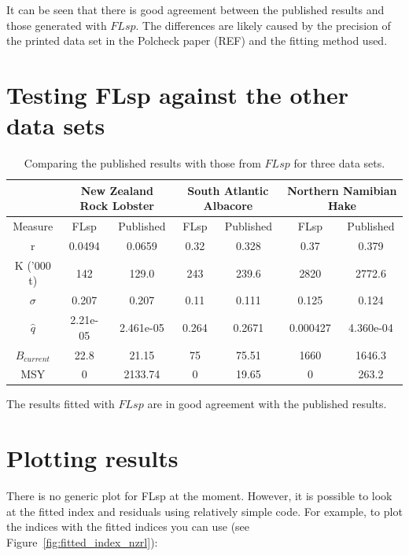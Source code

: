 \documentclass[a4paper]{article}
\begin{document}
It can be seen that there is good agreement between the published results and those generated with $FLsp$. The differences are likely caused by the precision of the printed data set in the Polcheck paper (REF) and the fitting method used.

\section{Testing FLsp against the other data sets}



\begin{table}
\begin{tabular}{|c|c|c|c|c|c|c|}
\hline
& \multicolumn{2}{|c|}{New Zealand Rock Lobster}
& \multicolumn{2}{|c|}{South Atlantic Albacore}
& \multicolumn{2}{|c|}{Northern Namibian Hake} \\
\hline
Measure & FLsp & Published & FLsp & Published & FLsp & Published \\
\hline
r          & 0.0494     & 0.0659    &  0.32     & 0.328 & 0.37     & 0.379     \\
K ('000 t) & 142     & 129.0     &  243     & 239.6  & 2820     & 2772.6    \\
$\sigma$   & 0.207 & 0.207     &  0.11 & 0.111  & 0.125 & 0.124     \\
$\hat{q}$  & 2.21e-05  & 2.461e-05 &  0.264  & 0.2671 & 0.000427  & 4.360e-04 \\
$B_{current}$  & 22.8  & 21.15 &  75  & 75.51 & 1660  & 1646.3 \\
MSY        &  0 & 2133.74 &  0  & 19.65 & 0  & 263.2 \\
\hline
\end{tabular}
\caption{Comparing the published results with those from $FLsp$ for three data sets.}
\label{tab:compare3datasets}
\end{table}

The results fitted with $FLsp$ are in good agreement with the published results.

\section{Plotting results}
There is no generic plot for FLsp at the moment. However, it is possible to look at the fitted index and residuals using relatively simple code. For example, to plot the indices with the fitted indices you can use (see Figure~\ref{fig:fitted_index_nzrl}):
\end{document}
